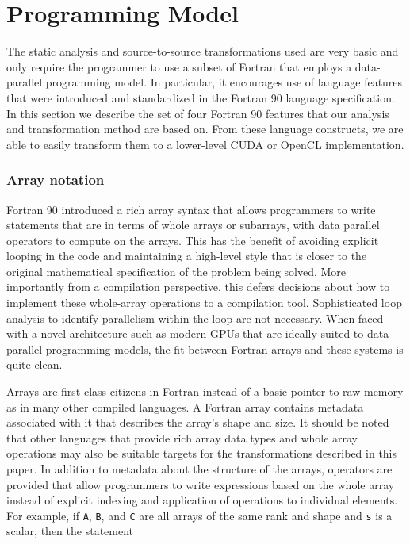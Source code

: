 \section{Programming Model}

The static analysis and source-to-source transformations used are very
basic and only require the programmer to use a subset of Fortran that
employs a data-parallel programming model.  In particular, it
encourages use of language features that were introduced and
standardized in the Fortran 90 language specification.  In this
section we describe the set of four Fortran 90 features that our analysis
and transformation method are based on.  From these language constructs,
we are able to easily transform them to a lower-level CUDA or OpenCL
implementation.


\subsubsection*{Array notation}

Fortran 90 introduced a rich array syntax that allows programmers to
write statements that are in terms of whole arrays or subarrays, with
data parallel operators to compute on the arrays.  This has the
benefit of avoiding explicit looping in the code and maintaining a
high-level style that is closer to the original mathematical
specification of the problem being solved.  More importantly from a
compilation perspective, this defers decisions about how to implement
these whole-array operations to a compilation tool.  Sophisticated
loop analysis to identify parallelism within the loop are not
necessary.  When faced with a novel architecture such as modern GPUs
that are ideally suited to data parallel programming models, the fit
between Fortran arrays and these systems is quite clean.

Arrays are first class citizens in Fortran instead of a basic pointer
to raw memory as in many other compiled languages.  A Fortran array
contains metadata associated with it that describes the array's shape
and size. It should be noted that other languages that provide rich
array data types and whole array operations may also be suitable
targets for the transformations described in this paper.  
In addition to metadata about the structure of the arrays, operators
are provided that allow programmers to write expressions based on the
whole array instead of explicit indexing and application of operations
to individual elements.  For example, if {\tt A}, {\tt B}, and {\tt C}
are all arrays of the same rank and shape and {\tt s} is a scalar,
then the statement

